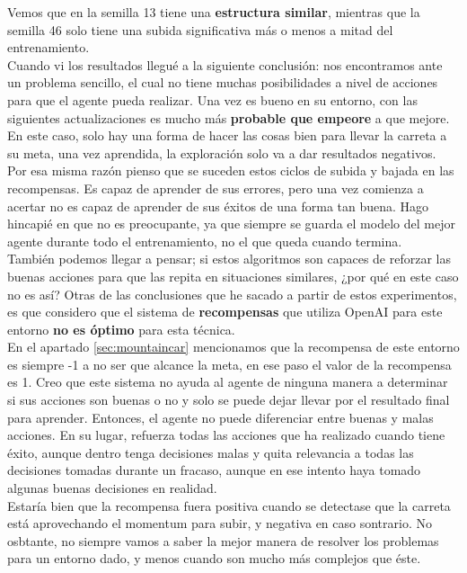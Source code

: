 \documentclass[11pt,fleqn]{book} %
\begin{document}
Vemos que en la semilla 13 tiene una \textbf{estructura similar}, mientras que la semilla 46 solo tiene una subida significativa más o menos a mitad del entrenamiento. \\

Cuando vi los resultados llegué a la siguiente conclusión: nos encontramos ante un problema sencillo, el cual no tiene muchas posibilidades a nivel de acciones para que el agente pueda realizar. Una vez es bueno en su entorno, con las siguientes actualizaciones es mucho más \textbf{probable que empeore} a que mejore. En este caso, solo hay una forma de hacer las cosas bien para llevar la carreta a su meta, una vez aprendida, la exploración solo va a dar resultados negativos. \\

Por esa misma razón pienso que se suceden estos ciclos de subida y bajada en las recompensas. Es capaz de aprender de sus errores, pero una vez comienza a acertar no es capaz de aprender de sus éxitos de una forma tan buena. Hago hincapié en que no es preocupante, ya que siempre se guarda el modelo del mejor agente durante todo el entrenamiento, no el que queda cuando termina. \\

También podemos llegar a pensar; si estos algoritmos son capaces de reforzar las buenas acciones para que las repita en situaciones similares, ¿por qué en este caso no es así? Otras de las conclusiones que he sacado a partir de estos experimentos, es que considero que el sistema de \textbf{recompensas} que utiliza OpenAI para este entorno \textbf{no es óptimo} para esta técnica. \\

En el apartado \ref{sec:mountaincar} mencionamos que la recompensa de este entorno es siempre -1 a no ser que alcance la meta, en ese paso el valor de la recompensa es 1. Creo que este sistema no ayuda al agente de ninguna manera a determinar si sus acciones son buenas o no y solo se puede dejar llevar por el resultado final para aprender. Entonces, el agente no puede diferenciar entre buenas y malas acciones. En su lugar, refuerza todas las acciones que ha realizado cuando tiene éxito, aunque dentro tenga decisiones malas y quita relevancia a todas las decisiones tomadas durante un fracaso, aunque en ese intento haya tomado algunas buenas decisiones en realidad. \\

Estaría bien que la recompensa fuera positiva cuando se detectase que la carreta está aprovechando el momentum para subir, y negativa en caso sontrario. No osbtante, no siempre vamos a saber la mejor manera de resolver los problemas para un entorno dado, y menos cuando son mucho más complejos que éste. \\
\end{document}
